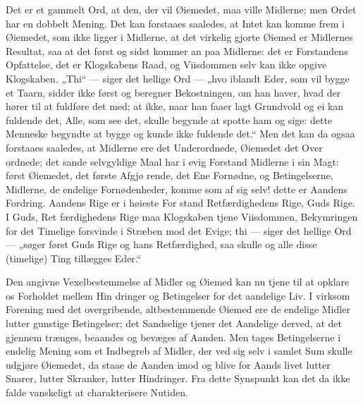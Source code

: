\documentclass[12pt]{book}
\newcommand{\opage}[1]{\marginnote{\footnotesize\textit{[#1]}}}
\begin{document}
Det er et gammelt Ord, at den, der vil Øiemedet,
maa ville Midlerne; men Ordet har en dobbelt Mening.
Det kan forstaaes saaledes, at Intet kan komme frem i
Øiemedet, som ikke ligger i Midlerne, at det virkelig\-%
gjorte Øiemed er Midlernes Resultat, saa at det først
og sidst kommer an paa Midlerne: det er Forstandens
Opfattelse, det er Klogskabens Raad, og Viisdommen
selv kan ikke opgive Klogskaben. „Thi“ --- siger det
hellige Ord --- „hvo iblandt Eder, som vil bygge et
Taarn, sidder ikke først og beregner Bekostningen, om
han haver, hvad der hører til at fuldføre det med; at
ikke, naar han faaer lagt Grundvold og ei kan fuldende
det, Alle, som see det, skulle begynde at spotte ham og
sige: dette Menneske begyndte at bygge og kunde ikke
fuldende det.“ Men det kan da ogsaa forstaaes saaledes,
at Midlerne ere det Underordnede, Øiemedet det Over\-%
ordnede; det sande selvgyldige Maal har i evig Forstand
Midlerne i sin Magt: først Øiemedet, det første Afgjø\-%
rende, det Ene Fornødne, og Betingelserne, Midlerne,
de endelige Fornødenheder, komme som af sig selv! dette
er Aandens Fordring. Aandens Rige er i høieste For\-%
stand Retfærdighedens Rige, Guds Rige. I Guds, Ret\-%
\opage{3}\setcounter{footnote}{0}%
færdighedens Rige maa Klogskaben tjene Viisdommen,
Bekymringen for det Timelige forsvinde i Stræben mod
det Evige; thi --- siger det hellige Ord --- „søger først
Guds Rige og hans Retfærdighed, saa skulle og alle
disse (timelige) Ting tillægges Eder.“

Den angivne Vexelbestemmelse af Midler og Øiemed
kan nu tjene til at opklare os Forholdet mellem Hin\-%
dringer og Betingelser for det aandelige Liv. I virksom
Forening med det overgribende, altbestemmende Øiemed
ere de endelige Midler lutter gunstige Betingelser; det
Sandselige tjener det Aandelige derved, at det gjennem\-%
trænges, beaandes og bevæges af Aanden. Men tages
Betingelserne i endelig Mening som et Indbegreb af
Midler, der ved sig selv i samlet Sum skulle udgjøre
Øiemedet, da staae de Aanden imod og blive for Aands\-%
livet lutter Snarer, lutter Skranker, lutter Hindringer.
Fra dette Synspunkt kan det da ikke falde vanskeligt at
charakterisere Nutiden.
\end{document}
